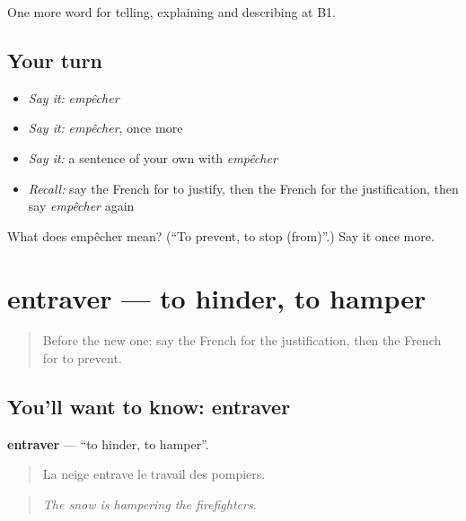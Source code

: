 \begin{grammarlens}[title={What you've built}]
One more word for telling, explaining and describing at B1.
\end{grammarlens}

\subsection*{Your turn}
\begin{itemize}
\raggedright
  \item \emph{Say it:} \emph{empêcher}
  \item \emph{Say it:} \emph{empêcher}, once more
  \item \emph{Say it:} a sentence of your own with \emph{empêcher}
  \item \emph{Recall:} say the French for to justify, then the French for the justification, then say \emph{empêcher} again
\end{itemize}

\begin{tcolorbox}[breakable,colback=teal!4,colframe=teal!35!black,title={Before you move on}]
What does empêcher mean? (\textquotedblleft{}To prevent, to stop (from)\textquotedblright{}.) Say it once more.
\end{tcolorbox}
\section[entraver]{entraver — to hinder, to hamper}

\label{lesson:FR-C352-entraver}



\begin{quote}
Before the new one: say the French for the justification, then the French for to prevent.
\end{quote}

\subsection*{You'll want to know: entraver}
\textbf{entraver} — \textquotedblleft{}to hinder, to hamper\textquotedblright{}.

\begin{quote}
La neige entrave le travail des pompiers.
\end{quote}

\begin{quote}
\emph{The snow is hampering the firefighters.}
\end{quote}


